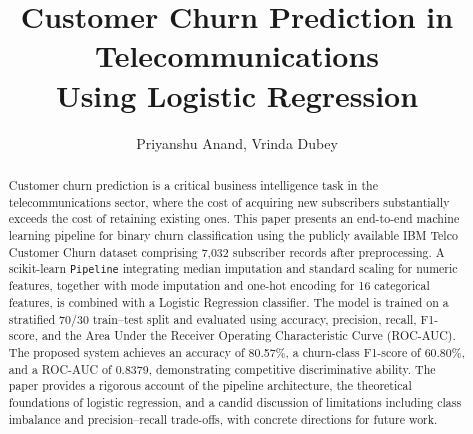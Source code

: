 \documentclass{llncs}
\begin{document}
\title{Customer Churn Prediction in Telecommunications\\
       Using Logistic Regression}


\author{Priyanshu Anand,
Vrinda Dubey}



\maketitle

\begin{abstract}
Customer churn prediction is a critical business intelligence task in the
telecommunications sector, where the cost of acquiring new subscribers
substantially exceeds the cost of retaining existing ones.
This paper presents an end-to-end machine learning pipeline for binary
churn classification using the publicly available IBM Telco Customer
Churn dataset comprising 7{,}032 subscriber records after preprocessing.
A scikit-learn \texttt{Pipeline} integrating median imputation and
standard scaling for numeric features, together with mode imputation and
one-hot encoding for 16 categorical features, is combined with a
Logistic Regression classifier.
The model is trained on a stratified 70/30 train--test split and
evaluated using accuracy, precision, recall, F1-score, and the
Area Under the Receiver Operating Characteristic Curve (ROC-AUC).
The proposed system achieves an accuracy of 80.57\%, a churn-class
F1-score of 60.80\%, and a ROC-AUC of 0.8379, demonstrating
competitive discriminative ability.
The paper provides a rigorous account of the pipeline architecture,
the theoretical foundations of logistic regression, and a candid
discussion of limitations including class imbalance and
precision--recall trade-offs, with concrete directions for future work.
\end{abstract}

\end{document}
